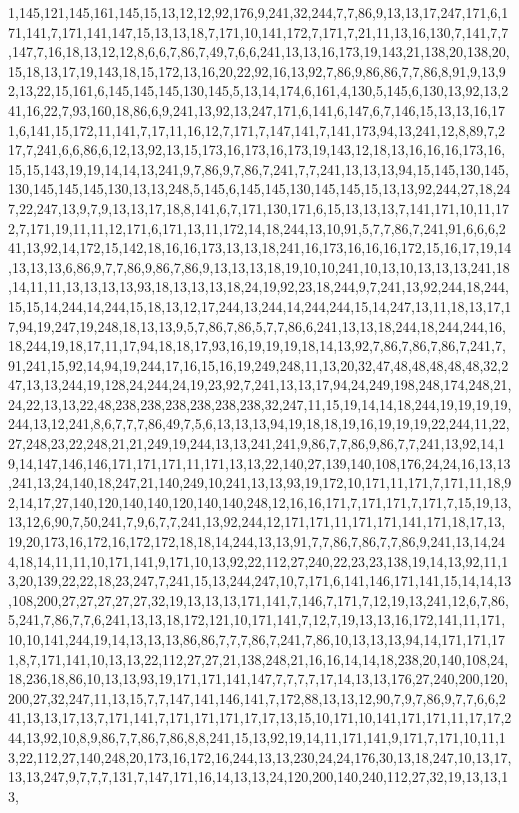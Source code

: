 1,145,121,145,161,145,15,13,12,12,92,176,9,241,32,244,7,7,86,9,13,13,17,247,171,6,171,141,7,171,141,147,15,13,13,18,7,171,10,141,172,7,171,7,21,11,13,16,130,7,141,7,7,147,7,16,18,13,12,12,8,6,6,7,86,7,49,7,6,6,241,13,13,16,173,19,143,21,138,20,138,20,15,18,13,17,19,143,18,15,172,13,16,20,22,92,16,13,92,7,86,9,86,86,7,7,86,8,91,9,13,92,13,22,15,161,6,145,145,145,130,145,5,13,14,174,6,161,4,130,5,145,6,130,13,92,13,241,16,22,7,93,160,18,86,6,9,241,13,92,13,247,171,6,141,6,147,6,7,146,15,13,13,16,171,6,141,15,172,11,141,7,17,11,16,12,7,171,7,147,141,7,141,173,94,13,241,12,8,89,7,217,7,241,6,6,86,6,12,13,92,13,15,173,16,173,16,173,19,143,12,18,13,16,16,16,173,16,15,15,143,19,19,14,14,13,241,9,7,86,9,7,86,7,241,7,7,241,13,13,13,94,15,145,130,145,130,145,145,145,130,13,13,248,5,145,6,145,145,130,145,145,15,13,13,92,244,27,18,247,22,247,13,9,7,9,13,13,17,18,8,141,6,7,171,130,171,6,15,13,13,13,7,141,171,10,11,172,7,171,19,11,11,12,171,6,171,13,11,172,14,18,244,13,10,91,5,7,7,86,7,241,91,6,6,6,241,13,92,14,172,15,142,18,16,16,173,13,13,18,241,16,173,16,16,16,172,15,16,17,19,14,13,13,13,6,86,9,7,7,86,9,86,7,86,9,13,13,13,18,19,10,10,241,10,13,10,13,13,13,241,18,14,11,11,13,13,13,13,93,18,13,13,13,18,24,19,92,23,18,244,9,7,241,13,92,244,18,244,15,15,14,244,14,244,15,18,13,12,17,244,13,244,14,244,244,15,14,247,13,11,18,13,17,17,94,19,247,19,248,18,13,13,9,5,7,86,7,86,5,7,7,86,6,241,13,13,18,244,18,244,244,16,18,244,19,18,17,11,17,94,18,18,17,93,16,19,19,19,18,14,13,92,7,86,7,86,7,86,7,241,7,91,241,15,92,14,94,19,244,17,16,15,16,19,249,248,11,13,20,32,47,48,48,48,48,48,32,247,13,13,244,19,128,24,244,24,19,23,92,7,241,13,13,17,94,24,249,198,248,174,248,21,24,22,13,13,22,48,238,238,238,238,238,238,32,247,11,15,19,14,14,18,244,19,19,19,19,244,13,12,241,8,6,7,7,7,86,49,7,5,6,13,13,13,94,19,18,18,19,16,19,19,19,22,244,11,22,27,248,23,22,248,21,21,249,19,244,13,13,241,241,9,86,7,7,86,9,86,7,7,241,13,92,14,19,14,147,146,146,171,171,171,11,171,13,13,22,140,27,139,140,108,176,24,24,16,13,13,241,13,24,140,18,247,21,140,249,10,241,13,13,93,19,172,10,171,11,171,7,171,11,18,92,14,17,27,140,120,140,140,120,140,140,248,12,16,16,171,7,171,171,7,171,7,15,19,13,13,12,6,90,7,50,241,7,9,6,7,7,241,13,92,244,12,171,171,11,171,171,141,171,18,17,13,19,20,173,16,172,16,172,172,18,18,14,244,13,13,91,7,7,86,7,86,7,7,86,9,241,13,14,244,18,14,11,11,10,171,141,9,171,10,13,92,22,112,27,240,22,23,23,138,19,14,13,92,11,13,20,139,22,22,18,23,247,7,241,15,13,244,247,10,7,171,6,141,146,171,141,15,14,14,13,108,200,27,27,27,27,27,32,19,13,13,13,171,141,7,146,7,171,7,12,19,13,241,12,6,7,86,5,241,7,86,7,7,6,241,13,13,18,172,121,10,171,141,7,12,7,19,13,13,16,172,141,11,171,10,10,141,244,19,14,13,13,13,86,86,7,7,7,86,7,241,7,86,10,13,13,13,94,14,171,171,171,8,7,171,141,10,13,13,22,112,27,27,21,138,248,21,16,16,14,14,18,238,20,140,108,24,18,236,18,86,10,13,13,93,19,171,171,141,147,7,7,7,7,17,14,13,13,176,27,240,200,120,200,27,32,247,11,13,15,7,7,147,141,146,141,7,172,88,13,13,12,90,7,9,7,86,9,7,7,6,6,241,13,13,17,13,7,171,141,7,171,171,171,17,17,13,15,10,171,10,141,171,171,11,17,17,244,13,92,10,8,9,86,7,7,86,7,86,8,8,241,15,13,92,19,14,11,171,141,9,171,7,171,10,11,13,22,112,27,140,248,20,173,16,172,16,244,13,13,230,24,24,176,30,13,18,247,10,13,17,13,13,247,9,7,7,7,131,7,147,171,16,14,13,13,24,120,200,140,240,112,27,32,19,13,13,13,